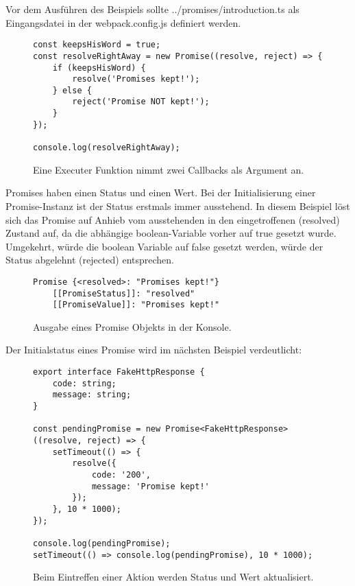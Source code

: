 \noindent
Vor dem Ausführen des Beispiels sollte ../promises/introduction.ts als Eingangsdatei in der webpack.config.js definiert werden.

\begin{figure}[H]
\begin{lstlisting}[basicstyle=\small]
const keepsHisWord = true;
const resolveRightAway = new Promise((resolve, reject) => {
    if (keepsHisWord) {
        resolve('Promises kept!');
    } else {
        reject('Promise NOT kept!');
    }
});

console.log(resolveRightAway);
\end{lstlisting}
\caption{Eine Executer Funktion nimmt zwei Callbacks als Argument an.}
\end{figure}

\noindent
Promises haben einen Status und einen Wert. Bei der Initialisierung einer Promise-Instanz ist der Status erstmals immer ausstehend. In diesem Beispiel löst sich das Promise auf Anhieb vom ausstehenden in den eingetroffenen (resolved) Zustand auf, da die abhängige boolean-Variable vorher auf true gesetzt wurde. Umgekehrt, würde die boolean Variable auf false gesetzt werden, würde der Status abgelehnt (rejected) entsprechen.

\begin{figure}[H]
\begin{lstlisting}
Promise {<resolved>: "Promises kept!"}
    [[PromiseStatus]]: "resolved"
    [[PromiseValue]]: "Promises kept!"
\end{lstlisting}
\caption{Ausgabe eines Promise Objekts in der Konsole.}
\end{figure}


\noindent
Der Initialstatus eines Promise wird im nächsten Beispiel verdeutlicht:

\begin{figure}[H]
\begin{lstlisting}[basicstyle=\small]
export interface FakeHttpResponse {
    code: string;
    message: string;
}

const pendingPromise = new Promise<FakeHttpResponse>((resolve, reject) => {
    setTimeout(() => {
        resolve({
            code: '200',
            message: 'Promise kept!'
        });
    }, 10 * 1000);
});

console.log(pendingPromise);
setTimeout(() => console.log(pendingPromise), 10 * 1000);
\end{lstlisting}
\caption{Beim Eintreffen einer Aktion werden Status und Wert aktualisiert.}
\end{figure}

